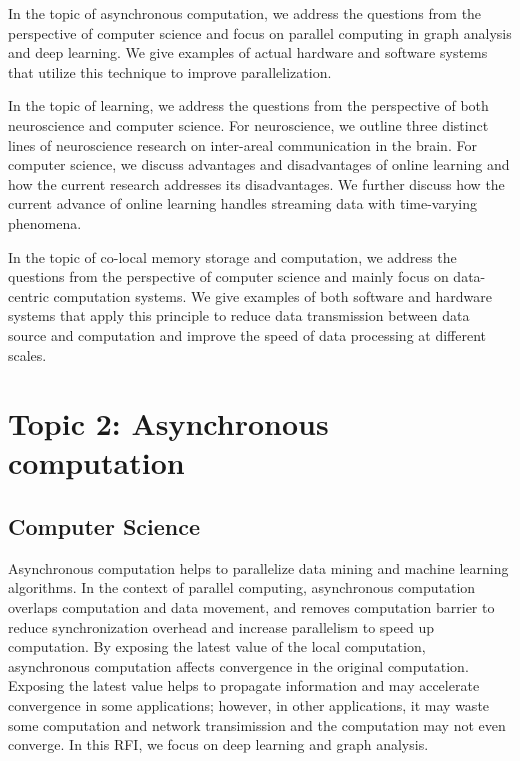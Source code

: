 \documentclass[12pt]{report}
\begin{document}
In the topic of asynchronous computation, we address the questions from
the perspective of computer science and focus on parallel computing in graph
analysis and deep learning. We give examples of actual hardware and software
systems that utilize this technique to improve parallelization.

In the topic of learning, we address the questions from the perspective of
both neuroscience and computer science. For neuroscience, we outline three
distinct lines of neuroscience research on inter-areal communication in the brain.
For computer science, we discuss advantages and disadvantages of online learning
and how the current research addresses its disadvantages. We further discuss
how the current advance of online learning handles streaming data with
time-varying phenomena.

In the topic of co-local memory storage and computation, we address
the questions from the perspective of computer science and mainly focus on
data-centric computation systems. We give examples of both software and
hardware systems that apply this principle to reduce data transmission between
data source and computation and improve the speed of data processing at
different scales.

\newpage

\section*{Topic 2: Asynchronous computation}

\subsection{Computer Science}

Asynchronous computation helps to parallelize data mining and machine learning
algorithms. In the context of parallel computing, asynchronous computation
overlaps computation and data movement, and removes computation barrier to
reduce synchronization
overhead and increase parallelism to speed up computation. By exposing
the latest value of the local computation, asynchronous computation affects
convergence in the original computation. Exposing the latest value helps to
propagate information and may accelerate convergence in some applications;
however, in other applications, it may waste some computation and network
transimission and the computation may not even converge. In this RFI, we
focus on deep learning and graph analysis.
\end{document}
